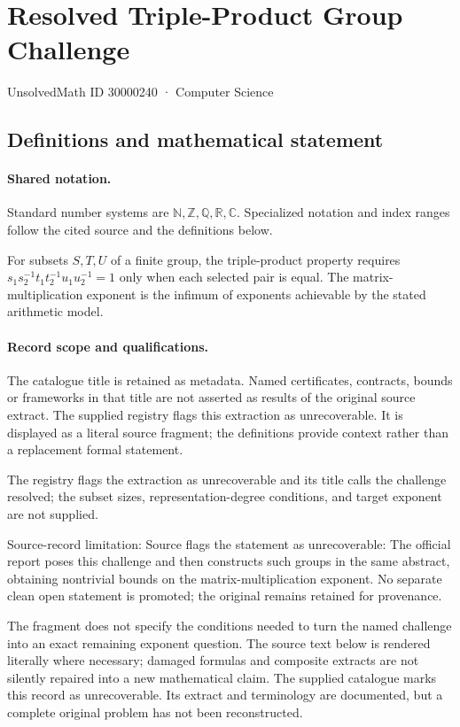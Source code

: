 \documentclass[11pt]{article}
\begin{document}
\setcounter{section}{30000239}
\section{Resolved Triple-Product Group Challenge}\label{30000240}
{\small\sffamily UnsolvedMath ID 30000240 · Computer Science}
\subsection{Definitions and mathematical statement}

\paragraph{Shared notation.}Standard number systems are $\mathbb N,\mathbb Z,\mathbb Q,\mathbb R,\mathbb C$. Specialized notation and index ranges follow the cited source and the definitions below.


For subsets $S,T,U$ of a finite group, the triple-product property requires $s_1s_2^{-1}t_1t_2^{-1}u_1u_2^{-1}=1$ only when each selected pair is equal. The matrix-multiplication exponent is the infimum of exponents achievable by the stated arithmetic model.
\paragraph{Record scope and qualifications.}
The catalogue title is retained as metadata. Named certificates, contracts, bounds or frameworks in that title are not asserted as results of the original source extract.
The supplied registry flags this extraction as unrecoverable. It is displayed as a literal source fragment; the definitions provide context rather than a replacement formal statement.

The registry flags the extraction as unrecoverable and its title calls the challenge resolved; the subset sizes, representation-degree conditions, and target exponent are not supplied.

Source-record limitation: Source flags the statement as unrecoverable: The official report poses this challenge and then constructs such groups in the same abstract, obtaining nontrivial bounds on the matrix-multiplication exponent. No separate clean open statement is promoted; the original remains retained for provenance.

The fragment does not specify the conditions needed to turn the named challenge into an exact remaining exponent question.
The source text below is rendered literally where necessary; damaged formulas and composite extracts are not silently repaired into a new mathematical claim.
The supplied catalogue marks this record as unrecoverable. Its extract and terminology are documented, but a complete original problem has not been reconstructed.
\end{document}
